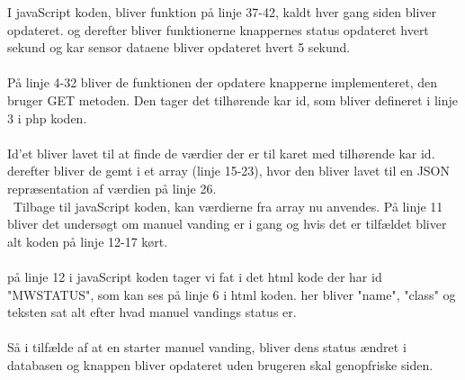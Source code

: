 I javaScript koden, bliver funktion på linje 37-42, kaldt hver gang siden bliver opdateret. og derefter bliver funktionerne knappernes status opdateret hvert sekund og kar sensor dataene bliver opdateret hvert 5 sekund. 
\\\\
På linje 4-32 bliver de funktionen der opdatere knapperne implementeret, den bruger GET metoden. Den tager det tilhørende kar id, som bliver defineret i linje 3 i php koden. 
\\\\
Id'et bliver lavet til at finde de værdier der er til karet med tilhørende kar id. derefter bliver de gemt i et array (linje 15-23), hvor den bliver lavet til en JSON repræsentation af værdien på linje 26. 
\\\
Tilbage til javaScript koden, kan værdierne fra array nu anvendes. På linje 11 bliver det undersøgt om manuel vanding er i gang og hvis det er tilfældet bliver alt koden på linje 12-17 kørt. 
\\\\
på linje 12 i javaScript koden tager vi fat i det html kode der har id "MWSTATUS", som kan ses på linje 6 i html koden. her bliver "name", "class" og teksten sat alt efter hvad manuel vandings status er. 
\\\\
Så i tilfælde af at en starter manuel vanding, bliver dens status ændret i databasen og knappen bliver opdateret uden brugeren skal genopfriske siden. 



 